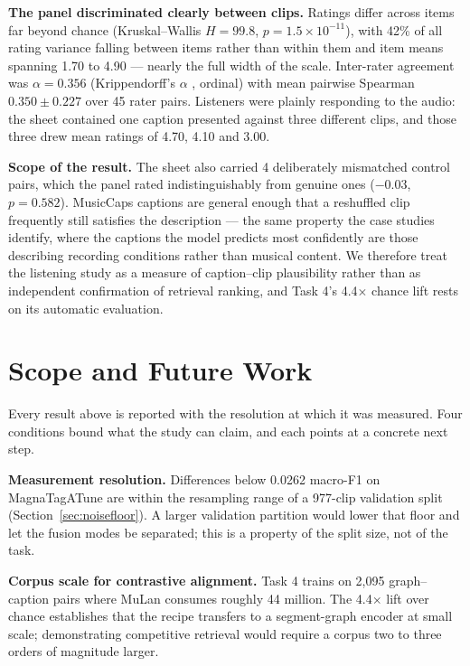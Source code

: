 \documentclass[conference]{IEEEtran}
\newcommand{\BootLeadSpread}{0.0262}
\newcommand{\BootValRows}{977}
\newcommand{\FourLiftTen}{4.4}
\newcommand{\HEAlpha}{0.356}
\newcommand{\HEBetweenH}{99.8}
\newcommand{\HEBetweenP}{1.5 \times 10^{-11}}
\newcommand{\HEControls}{4}
\newcommand{\HEGap}{-0.03}
\newcommand{\HEGapP}{0.582}
\newcommand{\HEItemMax}{4.90}
\newcommand{\HEItemMin}{1.70}
\newcommand{\HEPairs}{45}
\newcommand{\HESpearman}{0.350}
\newcommand{\HESpearmanSd}{0.227}
\newcommand{\HEVarShare}{42}
\newcommand{\MCTrain}{2{,}095}
\begin{document}
\textbf{The panel discriminated clearly between clips.} Ratings differ across
items far beyond chance (Kruskal--Wallis $H = \HEBetweenH{}$,
$p = \HEBetweenP{}$), with \HEVarShare{}\% of all rating variance falling
between items rather than within them and item means spanning \HEItemMin{} to
\HEItemMax{} --- nearly the full width of the scale. Inter-rater agreement was
$\alpha = \HEAlpha{}$ (Krippendorff's $\alpha$ \cite{krippendorff2004},
ordinal) with mean pairwise Spearman $\HESpearman{} \pm \HESpearmanSd{}$ over
\HEPairs{} rater pairs. Listeners were plainly responding to the audio: the
sheet contained one caption presented against three different clips, and those
three drew mean ratings of 4.70, 4.10 and 3.00.

\textbf{Scope of the result.} The sheet also carried \HEControls{} deliberately
mismatched control pairs, which the panel rated indistinguishably from genuine
ones ($\HEGap{}$, $p = \HEGapP{}$). MusicCaps captions are general enough that a
reshuffled clip frequently still satisfies the description --- the same property
the case studies identify, where the captions the model predicts most
confidently are those describing recording conditions rather than musical
content. We therefore treat the listening study as a measure of caption--clip
plausibility rather than as independent confirmation of retrieval ranking, and
Task 4's \FourLiftTen{}$\times$ chance lift rests on its automatic evaluation.

\section{Scope and Future Work}
Every result above is reported with the resolution at which it was measured.
Four conditions bound what the study can claim, and each points at a concrete
next step.

\textbf{Measurement resolution.} Differences below \BootLeadSpread{} macro-F1 on
MagnaTagATune are within the resampling range of a \BootValRows{}-clip
validation split (Section~\ref{sec:noisefloor}). A larger validation partition
would lower that floor and let the fusion modes be separated; this is a property
of the split size, not of the task.

\textbf{Corpus scale for contrastive alignment.} Task 4 trains on \MCTrain{}
graph--caption pairs where MuLan \cite{huang2022mulan} consumes roughly 44
million. The \FourLiftTen{}$\times$ lift over chance establishes that the recipe
transfers to a segment-graph encoder at small scale; demonstrating competitive
retrieval would require a corpus two to three orders of magnitude larger.
\end{document}
